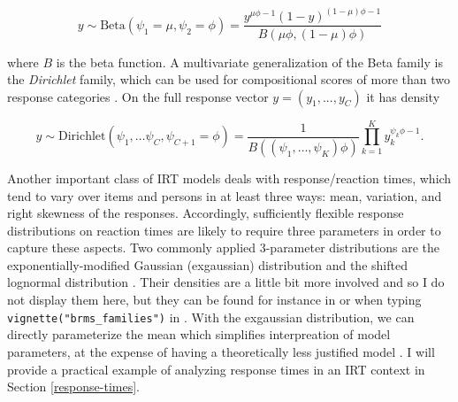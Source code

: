 \documentclass[jss]{jss}
\begin{document}
\[
y \sim \text{Beta}(\psi_1 = \mu, \psi_2 = \phi) = \frac{y^{\mu \phi - 1} (1-y)^{(1-\mu) \phi-1}}{B(\mu \phi, (1-\mu) \phi)}
\]

where \(B\) is the beta function. A multivariate generalization of the
Beta family is the \emph{Dirichlet} family, which can be used for
compositional scores of more than two response categories
\citep{hijazi2009}. On the full response vector \(y = (y_1, ..., y_C)\)
it has density

\[
y \sim \text{Dirichlet}(\psi_1, \ldots \psi_C, \psi_{C+1} = \phi) = 
 \frac{1}{B((\psi_{1}, \ldots, \psi_{K}) \phi)} 
 \prod_{k=1}^K y_{k}^{\psi_{k} \phi - 1}.
\]

Another important class of IRT models deals with response/reaction
times, which tend to vary over items and persons in at least three ways:
mean, variation, and right skewness of the responses. Accordingly,
sufficiently flexible response distributions on reaction times are
likely to require three parameters in order to capture these aspects.
Two commonly applied 3-parameter distributions are the
exponentially-modified Gaussian (exgaussian) distribution and the
shifted lognormal distribution \citep{heathcote1991, wagenmakers2007}.
Their densities are a little bit more involved and so I do not display
them here, but they can be found for instance in \citet{wagenmakers2007}
or when typing \texttt{vignette("brms\_families")} in . With
the exgaussian distribution, we can directly parameterize the mean which
simplifies interpreation of model parameters, at the expense of having a
theoretically less justified model \citep{heathcote1991}. I will provide
a practical example of analyzing response times in an IRT context in
Section \ref{response-times}.
\end{document}
